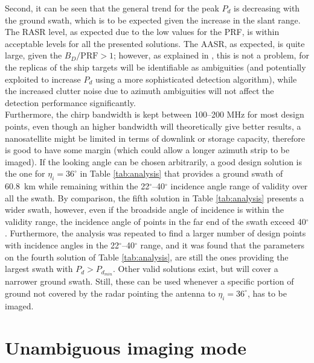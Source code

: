\documentclass[conference,a4paper]{IEEEtran}
\begin{document}
    Second, it can be seen that the general trend for the peak $P_d$ is decreasing with the ground swath, which is to be expected given the increase in the slant range.\\
    The RASR level, as expected due to the low values for the PRF, is within acceptable levels for all the presented solutions.
    The AASR, as expected, is quite large, given the $B_D/\text{PRF}>1$; however, as explained in \cite{DLRjournal}, this is not a problem, for the replicas of the ship targets will be identifiable as ambiguities (and potentially exploited to increase $P_d$ using a more sophisticated detection algorithm), while the increased clutter noise due to azimuth ambiguities will not affect the detection performance significantly.\\
    Furthermore, the chirp bandwidth is kept between 100--200 MHz for most design points, even though an higher bandwidth will theoretically give better results, a nanosatellite might be limited in terms of downlink or storage capacity, therefore is good to have some margin (which could allow a longer azimuth strip to be imaged).
    If the looking angle can be chosen arbitrarily, a good design solution is the one for $\eta_i=36^\circ$ in Table \ref{tab:analysis} that provides a ground swath of 60.8~km while remaining within the 22$^\circ$--40$^\circ$ incidence angle range of validity over all the swath.
    By comparison, the fifth solution in Table \ref{tab:analysis} presents a wider swath, however, even if the broadside angle of incidence is within the validity range, the incidence angle of points in the far end of the swath exceed 40$^\circ$.
    Furthermore, the analysis was repeated to find a larger number of design points with incidence angles in the 22$^\circ$--40$^\circ$ range, and it was found that the parameters on the fourth solution of Table \ref{tab:analysis}, are still the ones providing the largest swath with $P_d>P_{d_{min}}$.
    Other valid solutions exist, but will cover a narrower ground swath.
    Still, these can be used whenever a specific portion of ground not covered by the radar pointing the antenna to $\eta_i=36^\circ$, has to be imaged.


    \section{Unambiguous imaging mode}
    \label{sec:psi}
\end{document}
